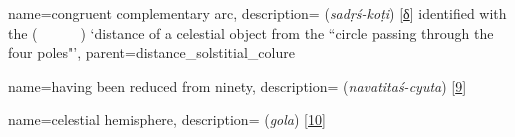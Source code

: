
{
        name={congruent complementary arc},
        description={ (\textit{sadṛś-koṭi}) [\hyperlink{SEpassD}{δ}]\newline
        identified with the  (\textit{\bud\idafaconsonant\ \kawkab\ \az\ \guillemotleft\dayiri\idafavowel\ \marri\ \biaqtab\idafaconsonant\ \arbai\guillemotright}) `distance of a celestial object from the ``circle passing through the four poles"'},
        parent={distance_solstitial_colure}
}





{       
        name={having been reduced from ninety},
        description={ (\textit{navatitaś-cyuta}) [\hyperlink{SEpass9}{9}]}
}

{
        name={celestial hemisphere},
        description={ (\textit{gola}) [\hyperlink{SEpass10}{10}]}
}

